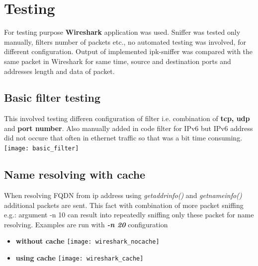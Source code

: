 \documentclass{article}
\begin{document}
\section{Testing}
For testing purpose \textbf{Wireshark} application was used. Sniffer was tested only manually, filters number of packets etc., no automated testing was involved, for different configuration. Output of implemented ipk-sniffer was compared with the same packet in Wireshark for same time, source and destination ports and addresses length and data of packet.
\subsection{Basic filter testing}
This involved testing differen configuration of filter i.e. combination of \textbf{tcp, udp} and \textbf{port number}. Also manually added in code filter for IPv6 but IPv6 address did not occure that often in ethernet traffic so that was a bit time consuming.\newline
\texttt{[image: basic\_filter]}
\subsection{Name resolving with cache}
When resolving FQDN from ip address using \textit{getaddrinfo()} and \textit{getnameinfo()} additional packets are sent. This fact with combination of more packet sniffing e.g.: argument -n 10 can result into repeatedly sniffing only these packet for name resolving.\newline
Examples are run with \textit{\textbf{-n 20}} configuration
\begin{itemize}
  \item \textbf{without cache} \newline
  \texttt{[image: wireshark\_nocache]}
 \item \textbf{using cache} \newline
  \texttt{[image: wireshark\_cache]}
\end{itemize}
\newpage
\end{document}
